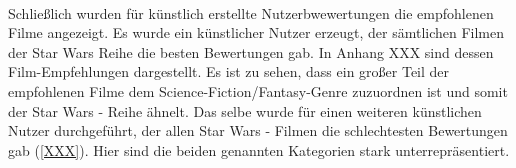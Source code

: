 \\
Schließlich wurden für künstlich erstellte Nutzerbwewertungen die empfohlenen Filme angezeigt. Es wurde ein künstlicher Nutzer erzeugt, der sämtlichen Filmen der Star Wars Reihe die besten Bewertungen gab. In Anhang XXX sind dessen Film-Empfehlungen dargestellt. Es ist zu sehen, dass ein großer Teil der empfohlenen Filme dem Science-Fiction/Fantasy-Genre zuzuordnen ist und somit der Star Wars - Reihe ähnelt. Das selbe wurde für einen weiteren künstlichen Nutzer durchgeführt, der allen Star Wars - Filmen die schlechtesten Bewertungen gab (\ref{XXX}). Hier sind die beiden genannten Kategorien stark unterrepräsentiert.


